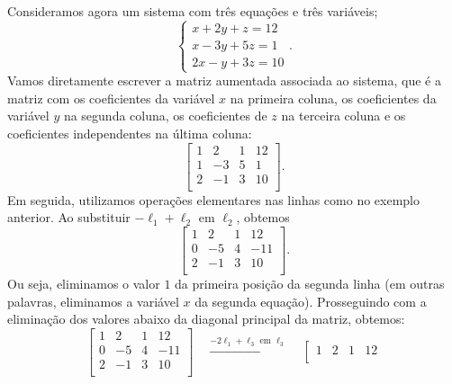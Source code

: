 \documentclass[../livro.tex]{subfiles} %
\begin{document}
\begin{example}\label{exemplo3por3}
Consideramos agora um sistema com três equações e três variáveis;
\begin{equation}
\left\{
  \begin{array}{ll}
    x + 2y + z = 12 \\
    x -3y + 5z = 1 \\
    2x - y + 3z = 10
  \end{array}
\right. .
\end{equation} Vamos diretamente escrever a matriz aumentada associada ao sistema, que é a matriz com os coeficientes da variável $x$ na primeira coluna, os coeficientes da variável $y$ na segunda coluna, os coeficientes de $z$ na terceira coluna e os coeficientes independentes na última coluna:
\begin{equation}
\left[
  \begin{array}{ccc|c}
    1 &  2 & 1 & 12 \\
    1 & -3 & 5 & 1 \\
    2 & -1 & 3 & 10 \\
  \end{array}
\right].
\end{equation} Em seguida, utilizamos operações elementares nas linhas como no exemplo anterior. Ao substituir $-\ell_1 + \ell_2$ em $\ell_2$, obtemos
\begin{equation}
\left[
  \begin{array}{ccc|c}
    1 &  2 & 1 & 12 \\
    0 & -5 & 4 & -11 \\
    2 & -1 & 3 & 10 \\
  \end{array}
\right].
\end{equation} Ou seja, eliminamos o valor $1$ da primeira posição da segunda linha (em outras palavras, eliminamos a variável $x$ da segunda equação). Prosseguindo com a eliminação dos valores abaixo da diagonal principal da matriz, obtemos:
\begin{equation}
\left[
  \begin{array}{ccc|c}
    1 &  2 & 1 & 12 \\
    0 & -5 & 4 & -11 \\
    2 & -1 & 3 & 10 \\
  \end{array}
\right]
\quad \xrightarrow{-2\ell_1 + \ell_3 \text{ em } \ell_3} \quad
\left[
  \begin{array}{ccc|c}
    1 &  2 & 1 &  12 \\

\end{array}
\end{equation}
\end{example}
\end{document}
